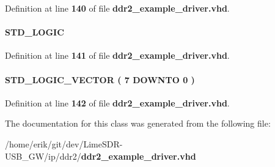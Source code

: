 Definition at line {\bf 140} of file {\bf ddr2\+\_\+example\+\_\+driver.\+vhd}.

\paragraph[{write\+\_\+req}]{ {\bfseries \textcolor{comment}{S\+T\+D\+\_\+\+L\+O\+G\+IC}\textcolor{vhdlchar}{ }} \hspace{0.3cm}{\ttfamily [Signal]}}\label{classddr2__example__driver_1_1europa_a8c76d0d21444dd5883c87cd10e3a1fd9}


Definition at line {\bf 141} of file {\bf ddr2\+\_\+example\+\_\+driver.\+vhd}.

\paragraph[{writes\+\_\+remaining}]{ {\bfseries \textcolor{comment}{S\+T\+D\+\_\+\+L\+O\+G\+I\+C\+\_\+\+V\+E\+C\+T\+OR}\textcolor{vhdlchar}{ }\textcolor{vhdlchar}{(}\textcolor{vhdlchar}{ }\textcolor{vhdlchar}{ } \textcolor{vhdldigit}{7} \textcolor{vhdlchar}{ }\textcolor{keywordflow}{D\+O\+W\+N\+TO}\textcolor{vhdlchar}{ }\textcolor{vhdlchar}{ } \textcolor{vhdldigit}{0} \textcolor{vhdlchar}{ }\textcolor{vhdlchar}{)}\textcolor{vhdlchar}{ }} \hspace{0.3cm}{\ttfamily [Signal]}}\label{classddr2__example__driver_1_1europa_a48dd42f9507a47efc8814e4d5a5ba737}


Definition at line {\bf 142} of file {\bf ddr2\+\_\+example\+\_\+driver.\+vhd}.



The documentation for this class was generated from the following file\+:\begin{DoxyCompactItemize}
\item 
/home/erik/git/dev/\+Lime\+S\+D\+R-\/\+U\+S\+B\+\_\+\+G\+W/ip/ddr2/{\bf ddr2\+\_\+example\+\_\+driver.\+vhd}\end{DoxyCompactItemize}
